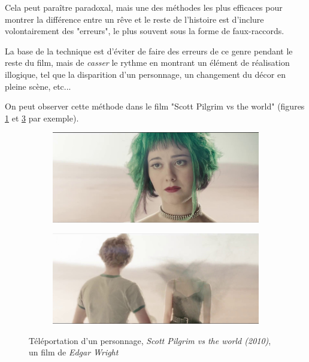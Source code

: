 \documentclass[../main.tex]{subfile}
\begin{document}
Cela peut paraître paradoxal, mais une des méthodes les plus efficaces pour
montrer la différence entre un rêve et le reste de l'histoire est d'inclure
volontairement des "erreurs", le plus souvent sous la forme de faux-raccords.

La base de la technique est d'éviter de faire des erreurs de ce genre pendant
le reste du film, mais de \emph{casser} le rythme en montrant un élément de
réalisation illogique, tel que la disparition d'un personnage, un changement du
décor en pleine scène, etc...

On peut observer cette méthode dans le film "Scott Pilgrim vs the world"
(figures \ref{fig:images_scott1} et \ref{fig:images_scott2} par exemple).

\begin{figure}
    \centering
    \begin{subfigure}[b]{0.49\textwidth}
        \includegraphics[width=\textwidth]{images/scott1}
        \caption{}
        \label{fig:images_scott1}
    \end{subfigure}
    \begin{subfigure}[b]{0.49\textwidth}
        \includegraphics[width=\textwidth]{images/scott2}
        \caption{}
        \label{fig:images_scott2}
    \end{subfigure}
    \caption{Téléportation d'un personnage, \textit{Scott Pilgrim vs the world
             (2010)}, un film de \textit{Edgar Wright}}
\end{figure}
\end{document}
